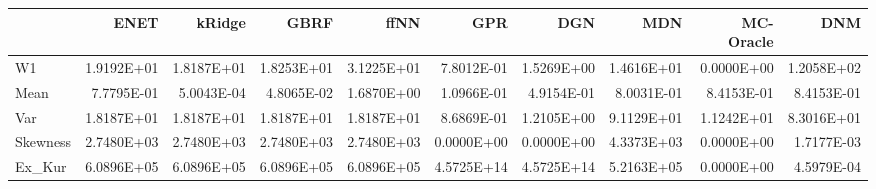 \begin{tabular}{lrrrrrrrrr}
\toprule
{} &       ENET &     kRidge &       GBRF &       ffNN &        GPR &        DGN &        MDN &  MC-Oracle &        DNM \\
\midrule
W1       & 1.9192E+01 & 1.8187E+01 & 1.8253E+01 & 3.1225E+01 & 7.8012E-01 & 1.5269E+00 & 1.4616E+01 & 0.0000E+00 & 1.2058E+02 \\
Mean     & 7.7795E-01 & 5.0043E-04 & 4.8065E-02 & 1.6870E+00 & 1.0966E-01 & 4.9154E-01 & 8.0031E-01 & 8.4153E-01 & 8.4153E-01 \\
Var      & 1.8187E+01 & 1.8187E+01 & 1.8187E+01 & 1.8187E+01 & 8.6869E-01 & 1.2105E+00 & 9.1129E+01 & 1.1242E+01 & 8.3016E+01 \\
Skewness & 2.7480E+03 & 2.7480E+03 & 2.7480E+03 & 2.7480E+03 & 0.0000E+00 & 0.0000E+00 & 4.3373E+03 & 0.0000E+00 & 1.7177E-03 \\
Ex\_Kur   & 6.0896E+05 & 6.0896E+05 & 6.0896E+05 & 6.0896E+05 & 4.5725E+14 & 4.5725E+14 & 5.2163E+05 & 0.0000E+00 & 4.5979E-04 \\
\bottomrule
\end{tabular}
